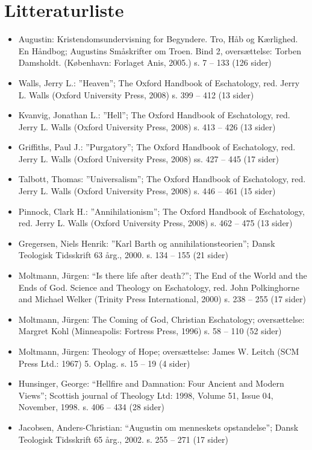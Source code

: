 \chapter{Litteraturliste}
\begin{itemize}
\item Augustin: Kristendomsundervisning for Begyndere. Tro, Håb og Kærlighed. En Håndbog; Augustins Småskrifter om Troen. Bind 2, oversættelse: Torben Damsholdt. (København: Forlaget Anis, 2005.) s. 7 – 133 (126 sider)
\item Walls, Jerry L.: ”Heaven”; The Oxford Handbook of Eschatology, red. Jerry L. Walls (Oxford University Press, 2008) s. 399 – 412 (13 sider)
\item Kvanvig, Jonathan L.: ”Hell”; The Oxford Handbook of Eschatology, red. Jerry L. Walls (Oxford University Press, 2008) s. 413 – 426 (13 sider)
\item Griffiths, Paul J.:  ”Purgatory”; The Oxford Handbook of Eschatology, red. Jerry L. Walls (Oxford University Press, 2008) ss. 427 – 445 (17 sider)
\item Talbott, Thomas: ”Universalism”; The Oxford Handbook of Eschatology, red. Jerry L. Walls (Oxford University Press, 2008) s. 446 – 461 (15 sider)
\item Pinnock, Clark H.: ”Annihilationism”; The Oxford Handbook of Eschatology, red. Jerry L. Walls (Oxford University Press, 2008) s. 462 – 475 (13 sider)
\item Gregersen, Niels Henrik: ”Karl Barth og annihilationsteorien”; Dansk Teologisk Tidsskrift 63 årg., 2000. s. 134 – 155 (21 sider)
\item Moltmann, Jürgen: “Is there life after death?”; The End of the World and the Ends of God. Science and Theology on Eschatology, red. John Polkinghorne and Michael Welker (Trinity Press International, 2000) s. 238 – 255 (17 sider)
\item Moltmann, Jürgen: The Coming of  God, Christian Eschatology; oversættelse: Margret Kohl (Minneapolis: Fortress Press, 1996) s. 58 – 110 (52 sider)
\item Moltmann, Jürgen: Theology of Hope; oversættelse: James W. Leitch (SCM Press Ltd.: 1967) 5. Oplag. s. 15 – 19 (4 sider) 
\item Hunsinger, George: “Hellfire and Damnation: Four Ancient and Modern Views”; Scottish journal of Theology Ltd: 1998, Volume 51, Issue 04, November, 1998. s. 406 – 434 (28 sider)
\item Jacobsen, Anders-Christian: “Augustin om menneskets opstandelse”; Dansk Teologisk Tidsskrift 65 årg., 2002. s. 255 – 271 (17 sider)

\end{itemize}
